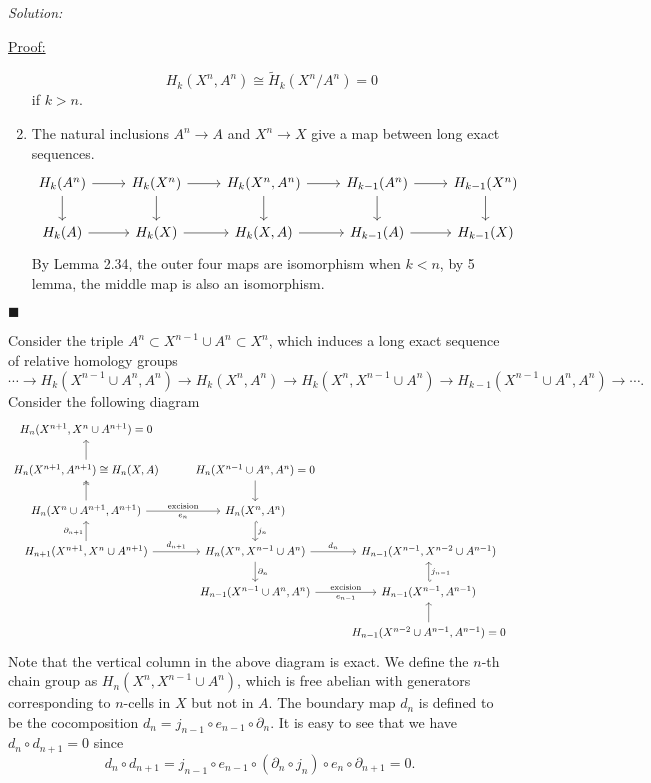 \documentclass[a4paper, 12pt]{article}
\newenvironment{solution}
    {\textit{Solution:}}
    {}
\newenvironment{claimproof}[1]{\par\noindent\underline{Proof:}\space#1}{\hfill $\blacksquare$}
\begin{document}
\begin{solution}
\begin{claimproof}
\begin{enumerate}[(1)]
\[H_k(X^n,A^n)\cong \tilde{H}_k(X^n/A^n)=0\]
if \(k>n\).
\item The natural inclusions \(A^n\rightarrow A\) and \(X^n\rightarrow X\) give a map between long exact sequences.
\[\begin{tikzcd}
	{H_k(A^n)} & {H_k(X^n)} & {H_k(X^n,A^n)} & {H_{k-1}(A^n)} & {H_{k-1}(X^n)} \\
	{H_k(A)} & {H_k(X)} & {H_k(X,A)} & {H_{k-1}(A)} & {H_{k-1}(X)}
	\arrow[from=1-1, to=1-2]
	\arrow[from=1-1, to=2-1]
	\arrow[from=1-2, to=1-3]
	\arrow[from=1-2, to=2-2]
	\arrow[from=1-3, to=1-4]
	\arrow[from=1-3, to=2-3]
	\arrow[from=1-4, to=1-5]
	\arrow[from=1-4, to=2-4]
	\arrow[from=1-5, to=2-5]
	\arrow[from=2-1, to=2-2]
	\arrow[from=2-2, to=2-3]
	\arrow[from=2-3, to=2-4]
	\arrow[from=2-4, to=2-5]
\end{tikzcd}\]
By Lemma 2.34, the outer four maps are isomorphism when \(k<n\), by 5 lemma, the middle map is also an isomorphism.
\end{enumerate}
\end{claimproof}

Consider the triple \(A^n\subset X^{n-1}\cup A^n\subset X^n\), which induces a long exact sequence of relative homology groups 
\[\cdots\rightarrow H_k(X^{n-1}\cup A^n,A^n)\rightarrow H_k(X^n,A^n)\rightarrow H_k(X^n,X^{n-1}\cup A^n)\rightarrow H_{k-1}(X^{n-1}\cup A^n,A^n)\rightarrow \cdots.\]
Consider the following diagram 
\[\begin{tikzcd}
	{H_n(X^{n+1},X^n\cup A^{n+1})=0} \\
	{H_n(X^{n+1},A^{n+1})\cong H_n(X,A)} & {H_n(X^{n-1}\cup A^n,A^n)=0} \\
	{H_n(X^n\cup A^{n+1},A^{n+1})} & {H_n(X^n,A^n)} \\
	{H_{n+1}(X^{n+1},X^n\cup A^{n+1})} & {H_n(X^n,X^{n-1}\cup A^n)} & {H_{n-1}(X^{n-1},X^{n-2}\cup A^{n-1})} \\
	& {H_{n-1}(X^{n-1}\cup A^n,A^n)} & {H_{n-1}(X^{n-1},A^{n-1})} \\
	&& {H_{n-1}(X^{n-2}\cup A^{n-1},A^{n-1})=0}
	\arrow[from=2-1, to=1-1]
	\arrow[from=2-2, to=3-2]
	\arrow[two heads, from=3-1, to=2-1]
	\arrow["{e_n}"',"\text{excision}", from=3-1, to=3-2]
	\arrow["{j_n}", hook, from=3-2, to=4-2]
	\arrow["{\partial_{n+1}}", from=4-1, to=3-1]
	\arrow["{d_{n+1}}", from=4-1, to=4-2]
	\arrow["{d_n}", from=4-2, to=4-3]
	\arrow["{\partial_n}", from=4-2, to=5-2]
	\arrow["{e_{n-1}}"', "\text{excision}",from=5-2, to=5-3]
	\arrow["{j_{n-1}}"', hook', from=5-3, to=4-3]
	\arrow[from=6-3, to=5-3]
\end{tikzcd}\]
Note that the vertical column in the above diagram is exact. We define the \(n\)-th chain group as \(H_n(X^n,X^{n-1}\cup A^n)\), which is free abelian with generators corresponding to \(n\)-cells in \(X\) but not in \(A\). The boundary map \(d_n\) is 
defined to be the cocomposition \(d_n=j_{n-1}\circ e_{n-1}\circ \partial_n\). It is easy to see that we have \(d_n\circ d_{n+1}=0\) since 
\[d_n\circ d_{n+1}=j_{n-1}\circ e_{n-1} \circ (\partial_n\circ j_n)\circ e_n\circ \partial_{n+1}=0.\]


\end{solution}
\end{document}
